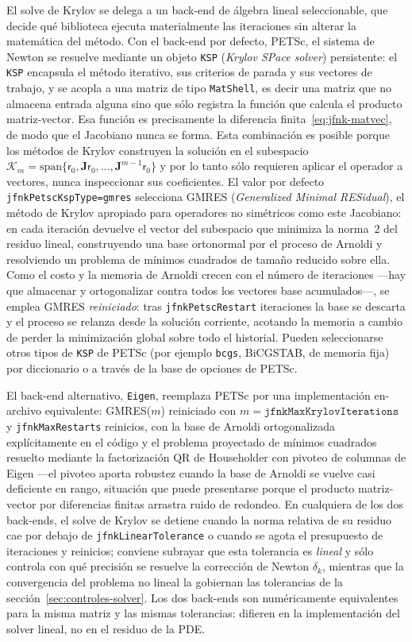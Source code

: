 \documentclass[11pt,a4paper]{article}
\newcommand{\code}[1]{\texttt{\small #1}}
\begin{document}
El solve de Krylov se delega a un back-end de álgebra lineal seleccionable, que decide qué biblioteca ejecuta materialmente las iteraciones sin alterar la matemática del método. Con el back-end por defecto, PETSc, el sistema de Newton se resuelve mediante un objeto \code{KSP} (\emph{Krylov SPace solver}) persistente: el \code{KSP} encapsula el método iterativo, sus criterios de parada y sus vectores de trabajo, y se acopla a una matriz de tipo \code{MatShell}, es decir una matriz que no almacena entrada alguna sino que sólo registra la función que calcula el producto matriz-vector. Esa función es precisamente la diferencia finita~\eqref{eq:jfnk-matvec}, de modo que el Jacobiano nunca se forma. Esta combinación es posible porque los métodos de Krylov construyen la solución en el subespacio $\mathcal{K}_m=\mathrm{span}\{\mathsf{r}_0,\mathbf{J}\mathsf{r}_0,\ldots,\mathbf{J}^{m-1}\mathsf{r}_0\}$ y por lo tanto sólo requieren aplicar el operador a vectores, nunca inspeccionar sus coeficientes. El valor por defecto \code{jfnkPetscKspType=gmres} selecciona GMRES (\emph{Generalized Minimal RESidual}), el método de Krylov apropiado para operadores no simétricos como este Jacobiano: en cada iteración devuelve el vector del subespacio que minimiza la norma~2 del residuo lineal, construyendo una base ortonormal por el proceso de Arnoldi y resolviendo un problema de mínimos cuadrados de tamaño reducido sobre ella. Como el costo y la memoria de Arnoldi crecen con el número de iteraciones —hay que almacenar y ortogonalizar contra todos los vectores base acumulados—, se emplea GMRES \emph{reiniciado}: tras \code{jfnkPetscRestart} iteraciones la base se descarta y el proceso se relanza desde la solución corriente, acotando la memoria a cambio de perder la minimización global sobre todo el historial. Pueden seleccionarse otros tipos de \code{KSP} de PETSc (por ejemplo \code{bcgs}, BiCGSTAB, de memoria fija) por diccionario o a través de la base de opciones de PETSc.

El back-end alternativo, \code{Eigen}, reemplaza PETSc por una implementación en-archivo equivalente: GMRES($m$) reiniciado con $m=\texttt{jfnkMaxKrylovIterations}$ y \code{jfnkMaxRestarts} reinicios, con la base de Arnoldi ortogonalizada explícitamente en el código y el problema proyectado de mínimos cuadrados resuelto mediante la factorización QR de Householder con pivoteo de columnas de Eigen —el pivoteo aporta robustez cuando la base de Arnoldi se vuelve casi deficiente en rango, situación que puede presentarse porque el producto matriz-vector por diferencias finitas arrastra ruido de redondeo. En cualquiera de los dos back-ends, el solve de Krylov se detiene cuando la norma relativa de su residuo cae por debajo de \code{jfnkLinearTolerance} o cuando se agota el presupuesto de iteraciones y reinicios; conviene subrayar que esta tolerancia es \emph{lineal} y sólo controla con qué precisión se resuelve la corrección de Newton $\delta_k$, mientras que la convergencia del problema no lineal la gobiernan las tolerancias de la sección~\ref{sec:controles-solver}. Los dos back-ends son numéricamente equivalentes para la misma matriz y las mismas tolerancias: difieren en la implementación del solver lineal, no en el residuo de la PDE.
\end{document}
